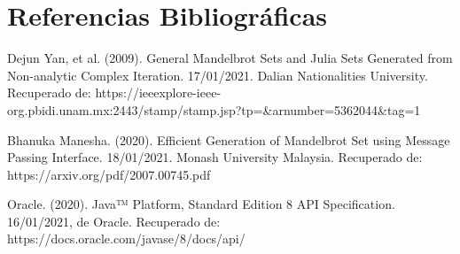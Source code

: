 \documentclass[12pt,a4paper]{article}
\begin{document}
	\section{Referencias Bibliográficas}
		\begin{thebibliography}{3}
			Dejun Yan, et al. (2009). General Mandelbrot Sets and Julia Sets Generated from Non-analytic Complex Iteration. 17/01/2021. Dalian Nationalities University. Recuperado de: https://ieeexplore-ieee-org.pbidi.unam.mx:2443/stamp/stamp.jsp?tp=\&arnumber=5362044\&tag=1
			
			Bhanuka Manesha. (2020). Efficient Generation of Mandelbrot Set using Message Passing Interface. 18/01/2021. Monash University Malaysia. Recuperado de: https://arxiv.org/pdf/2007.00745.pdf
			
			Oracle. (2020). Java™ Platform, Standard Edition 8 API Specification. 16/01/2021, de Oracle. Recuperado de: https://docs.oracle.com/javase/8/docs/api/
		\end{thebibliography}
	
	
	
	
	
	
	
	
	
	
\end{document}
